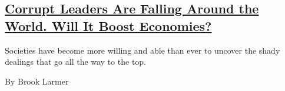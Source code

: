 \begin{enumerate}
  \hypertarget{corrupt-leaders-are-falling-around-the-world-will-it-boost-economies}{%
  \subsection{\texorpdfstring{\href{/2018/05/02/magazine/busted-leaders-boosted-economies.html}{Corrupt
  Leaders Are Falling Around the World. Will It Boost
  Economies?}}{Corrupt Leaders Are Falling Around the World. Will It Boost Economies?}}\label{corrupt-leaders-are-falling-around-the-world-will-it-boost-economies}}

  Societies have become more willing and able than ever to uncover the
  shady dealings that go all the way to the top.

  By Brook Larmer
\end{enumerate}

